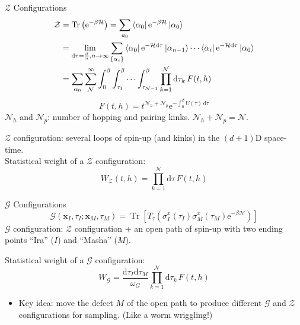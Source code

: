 \documentclass[aspectratio=43]{beamer}
\DeclareMathOperator{\Tr}{Tr}
\begin{document}
\begin{frame}{$\mathcal{Z}$ Configurations}
  \begin{align*}
    \mathcal{Z} &= \Tr \left(\mathrm{e}^{-\beta \mathcal{H}}\right) = \sum_{a_0}\bra{\alpha_0}\mathrm{e}^{-\beta \mathcal{H}}\ket{\alpha_0}\\
                &= \lim_{\mathrm{d}\tau = \frac{\beta}{n}, n \to \infty} \sum_{\{\alpha_i\}}\bra{\alpha_0}\mathrm{e}^{-\mathcal{H}\mathrm{d}\tau}\ket{\alpha_{n-1}}\cdots \bra{\alpha_i}\mathrm{e}^{-\mathcal{H}\mathrm{d}\tau}\ket{\alpha_0}\\
                &= \sum_{\alpha_0}\sum_{\mathcal{N}}^{\infty}\int_{0}^{\beta}\int_{\tau_1}^{\beta}\cdots \int_{\tau_{\mathcal{N}-1}}^{\beta} \prod_{k=1}^{\mathcal{N}}\mathrm{d}\tau_k\,F(t, h)
  \end{align*}
  \[
    F(t, h) = t^{\mathcal{N}_h+\mathcal{N}_p}\mathrm{e}^{-\int_{0}^{\beta}U(\tau)\,\mathrm{d}\tau}
  \]
  $\mathcal{N}_h$ and $\mathcal{N}_p$: number of hopping and pairing kinks. $\mathcal{N}_h + \mathcal{N}_p = \mathcal{N}$.

  $\mathcal{Z}$ configuration: several loops of spin-up (and kinks) in the $(d+1)$D space-time.\\
  Statistical weight of a $\mathcal{Z}$ configuration:
  \[
    W_{\mathcal{Z}}(t, h) = \prod_{k=1}^{\mathcal{N}}\mathrm{d}\tau\,F(t, h)
  \]
\end{frame}

\begin{frame}{$\mathcal{G}$ Configurations}
  \[
    \mathcal{G}(\bm{x}_I, \tau_I; \bm{x}_M, \tau_M) = \Tr\left[ T_\tau\left( \sigma_I^x(\tau_I)\sigma_M^x(\tau_M)\mathrm{e}^{-\beta\mathcal{H}} \right) \right]
  \]
  $\mathcal{G}$ configuration: $\mathcal{Z}$ configuration + an open path of spin-up with two ending points ``Ira'' ($I$) and ``Masha'' ($M$).

  Statistical weight of a $\mathcal{G}$ configuration:
  \[
    W_\mathcal{G} = \frac{\mathrm{d}\tau_I\mathrm{d}\tau_M}{\omega_G} \prod_{k=1}^{\mathcal{N}}\mathrm{d}\tau_k\,F(t, h)
  \]
  \begin{itemize}
    \item Key idea: move the defect $M$ of the open path to produce different $\mathcal{G}$ and $\mathcal{Z}$ configurations for sampling. (Like a worm wriggling!)
  \end{itemize}
\end{frame}
\end{document}
